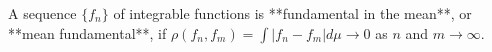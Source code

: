 A sequence $\{f_n\}$ of integrable functions is **fundamental in the mean**, or **mean fundamental**, if $\rho(f_n, f_m) = \int |f_n - f_m| d\mu \to 0$ as $n$ and $m \to \infty$.
